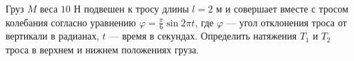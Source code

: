 Груз $M$ веса $10$ Н подвешен к тросу длины $l = 2$ м
и совершает вместе с тросом колебания согласно уравнению
$\varphi = \frac{\pi}{6}\sin{2\pi t}$,
где $\varphi$ --- угол отклонения троса от вертикали в радианах,
$t$ --- время в секундах.
Определить натяжения $T_1$ и $T_2$ троса в верхнем и нижнем положениях груза.
